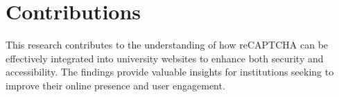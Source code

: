 \documentclass[12pt]{article}
\begin{document}
\section{Contributions}
This research contributes to the understanding of how reCAPTCHA can be effectively integrated into university websites to enhance both security and accessibility. The findings provide valuable insights for institutions seeking to improve their online presence and user engagement.
\end{document}
